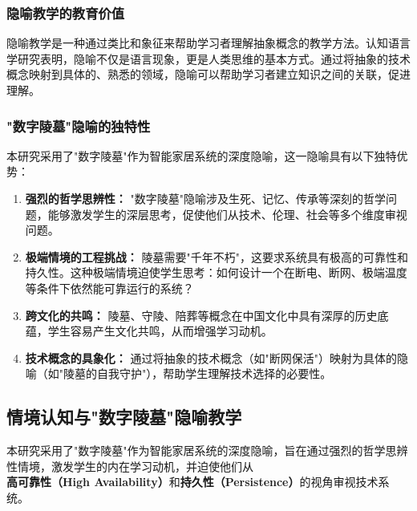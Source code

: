 \documentclass[12pt,a4paper,fontset=fandol]{ctexart}
\begin{document}
\subsubsection{隐喻教学的教育价值}
隐喻教学是一种通过类比和象征来帮助学习者理解抽象概念的教学方法。认知语言学研究表明，隐喻不仅是语言现象，更是人类思维的基本方式\cite{lakoff1980}。通过将抽象的技术概念映射到具体的、熟悉的领域，隐喻可以帮助学习者建立知识之间的关联，促进理解。

\subsubsection{"数字陵墓"隐喻的独特性}
本研究采用了"数字陵墓"作为智能家居系统的深度隐喻，这一隐喻具有以下独特优势：

\begin{enumerate}
    \item \textbf{强烈的哲学思辨性：} "数字陵墓"隐喻涉及生死、记忆、传承等深刻的哲学问题，能够激发学生的深层思考，促使他们从技术、伦理、社会等多个维度审视问题。
    
    \item \textbf{极端情境的工程挑战：} 陵墓需要"千年不朽"，这要求系统具有极高的可靠性和持久性。这种极端情境迫使学生思考：如何设计一个在断电、断网、极端温度等条件下依然能可靠运行的系统？
    
    \item \textbf{跨文化的共鸣：} 陵墓、守陵、陪葬等概念在中国文化中具有深厚的历史底蕴，学生容易产生文化共鸣，从而增强学习动机。
    
    \item \textbf{技术概念的具象化：} 通过将抽象的技术概念（如"断网保活"）映射为具体的隐喻（如"陵墓的自我守护"），帮助学生理解技术选择的必要性。
\end{enumerate}

\subsection{情境认知与"数字陵墓"隐喻教学}
本研究采用了"数字陵墓"作为智能家居系统的深度隐喻，旨在通过强烈的哲学思辨性情境，激发学生的内在学习动机，并迫使他们从\textbf{高可靠性（High Availability）}和\textbf{持久性（Persistence）}的视角审视技术系统。
\end{document}
